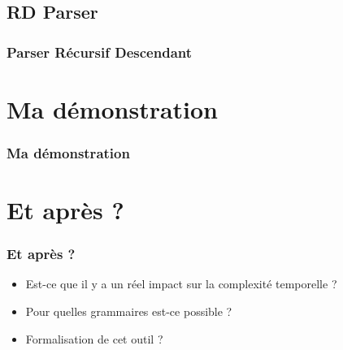 \documentclass{beamer}
\begin{document}
\subsection{RD Parser}
\begin{frame}
\frametitle{Parser Récursif Descendant}

\end{frame}

\section{Ma démonstration}
\begin{frame}
\frametitle{Ma démonstration}
\end{frame}

\section{Et après ?}
\begin{frame}
\frametitle{Et après ?}
\begin{itemize}
		\item<1-> Est-ce que il y a un réel impact sur la complexité temporelle ?
		\item<2->Pour quelles grammaires est-ce possible ?
		\item<3->Formalisation de cet outil ?
\end{itemize}
\end{frame}
\end{document}

